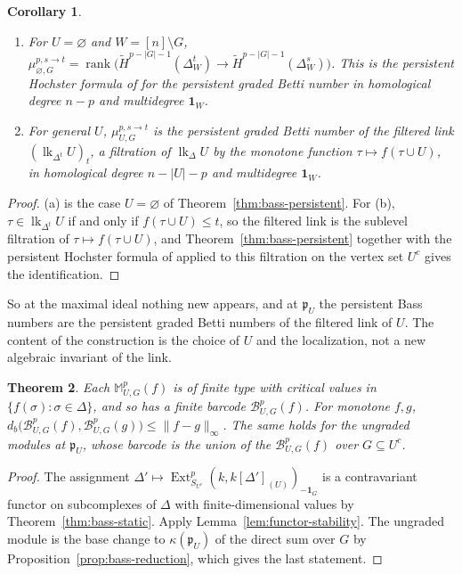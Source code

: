 \documentclass[11pt]{article}
\theoremstyle{plain}
\newtheorem{theorem}{Theorem}[section]
\newtheorem{corollary}[theorem]{Corollary}
\theoremstyle{definition}
\newcommand{\kk}{k}
\newcommand{\pp}{\mathfrak{p}}
\newcommand{\link}{\operatorname{lk}}
\newcommand{\Ext}{\operatorname{Ext}}
\newcommand{\rank}{\operatorname{rank}}
\newcommand{\rH}{\widetilde{H}}
\newcommand{\one}{\mathbf 1}
\begin{document}
\begin{corollary}\label{cor:bass-betti}
\begin{enumerate}[label=\textup{(\alph*)},nosep]
\item For $U=\varnothing$ and $W=[n]\setminus G$,
$\mu^{p,s\to t}_{\varnothing,G}=\rank\bigl(\rH^{p-|G|-1}(\Delta^t_W)\to\rH^{p-|G|-1}(\Delta^s_W)\bigr)$.
This is the persistent Hochster formula of \cite{SuwayyidWeiGraphs} for the persistent graded Betti number in
homological degree $n-p$ and multidegree $\one_W$.
\item For general $U$, $\mu^{p,s\to t}_{U,G}$ is the persistent graded Betti number of the filtered link
$(\link_{\Delta^t}U)_t$, a filtration of $\link_\Delta U$ by the monotone function $\tau\mapsto f(\tau\cup U)$,
in homological degree $n-|U|-p$ and multidegree $\one_W$.
\end{enumerate}
\end{corollary}

\begin{proof}
(a) is the case $U=\varnothing$ of Theorem~\ref{thm:bass-persistent}. For (b), $\tau\in\link_{\Delta^t}U$ if and
only if $f(\tau\cup U)\le t$, so the filtered link is the sublevel filtration of $\tau\mapsto f(\tau\cup U)$, and
Theorem~\ref{thm:bass-persistent} together with the persistent Hochster formula of \cite{SuwayyidWeiGraphs}
applied to this filtration on the vertex set $U^c$ gives the identification.
\end{proof}

So at the maximal ideal nothing new appears, and at $\pp_U$ the persistent Bass numbers are the persistent
graded Betti numbers of the filtered link of $U$. The content of the construction is the choice of $U$ and the
localization, not a new algebraic invariant of the link.

\begin{theorem}\label{thm:bass-stability}
Each $\mathbb M^p_{U,G}(f)$ is of finite type with critical values in $\{f(\sigma):\sigma\in\Delta\}$, and so
has a finite barcode $\mathcal B^p_{U,G}(f)$. For monotone $f,g$,
$d_b\bigl(\mathcal B^p_{U,G}(f),\mathcal B^p_{U,G}(g)\bigr)\le\|f-g\|_\infty$. The same holds for the ungraded
modules at $\pp_U$, whose barcode is the union of the $\mathcal B^p_{U,G}(f)$ over $G\subseteq U^c$.
\end{theorem}

\begin{proof}
The assignment $\Delta'\mapsto\Ext^p_{S_{U^c}}(\kk,\kk[\Delta']_{(U)})_{-\one_G}$ is a contravariant functor on
subcomplexes of $\Delta$ with finite-dimensional values by Theorem~\ref{thm:bass-static}. Apply
Lemma~\ref{lem:functor-stability}. The ungraded module is the base change to $\kappa(\pp_U)$ of the direct sum
over $G$ by Proposition~\ref{prop:bass-reduction}, which gives the last statement.
\end{proof}
\end{document}
